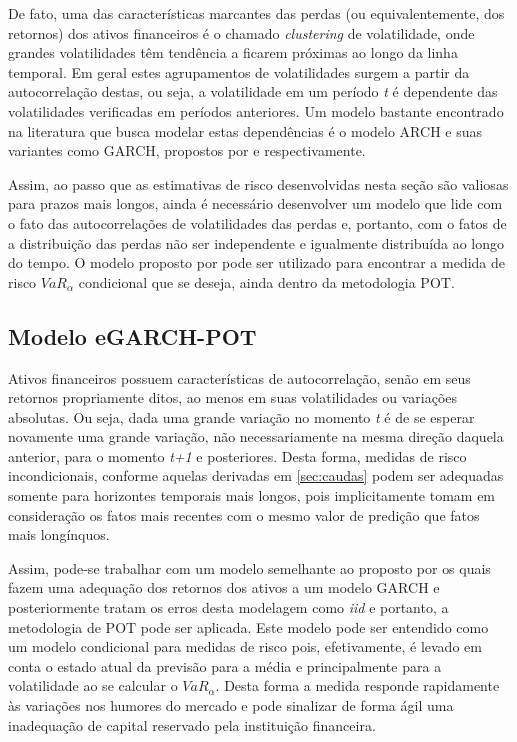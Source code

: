 \documentclass[review]{elsarticle}
\theoremstyle{definition}
\begin{document}
De fato, uma das características marcantes das perdas (ou equivalentemente, dos retornos) dos ativos financeiros é o chamado \emph{clustering} de volatilidade, onde grandes volatilidades têm tendência a ficarem próximas ao longo da linha temporal. Em geral estes agrupamentos de volatilidades surgem a partir da autocorrelação destas, ou seja, a volatilidade em um período \emph{t} é dependente das volatilidades verificadas em períodos anteriores. Um modelo bastante encontrado na literatura que busca modelar estas dependências é o modelo ARCH e suas variantes como GARCH, propostos por \cite{Engle1982} e \cite{Bollerslev1986} respectivamente.

Assim, ao passo que as estimativas de risco desenvolvidas nesta seção são valiosas para prazos mais longos, ainda é necessário desenvolver um modelo que lide com o fato das autocorrelações de volatilidades das perdas e, portanto, com o fatos de a distribuição das perdas não ser independente e igualmente distribuída ao longo do tempo. O modelo proposto por \cite{McNeil2000} pode ser utilizado para encontrar a medida de risco $VaR_\alpha$ condicional que se deseja, ainda dentro da metodologia POT.

\subsection{Modelo eGARCH-POT}
\label{sec:egarchpot}

Ativos financeiros possuem características de autocorrelação, senão em seus retornos propriamente ditos, ao menos em suas volatilidades ou variações absolutas. Ou seja, dada uma grande variação no momento \emph{t} é de se esperar novamente uma grande variação, não necessariamente na mesma direção daquela anterior, para o momento \emph{t+1} e posteriores. Desta forma, medidas de risco incondicionais, conforme aquelas derivadas em \ref{sec:caudas} podem ser adequadas somente para horizontes temporais mais longos, pois implicitamente tomam em consideração os fatos mais recentes com o mesmo valor de predição que fatos mais longínquos.

Assim, pode-se trabalhar com um modelo semelhante ao proposto por \cite{McNeil2000} os quais fazem uma adequação dos retornos dos ativos a um modelo GARCH e posteriormente tratam os erros desta modelagem como \emph{iid} e portanto, a metodologia de POT pode ser aplicada. Este modelo pode ser entendido como um modelo condicional para medidas de risco pois, efetivamente, é levado em conta o estado atual da previsão para a média e principalmente para a volatilidade ao se calcular o $VaR_\alpha$. Desta forma a medida responde rapidamente às variações nos humores do mercado e pode sinalizar de forma ágil uma inadequação de capital reservado pela instituição financeira.
\end{document}
